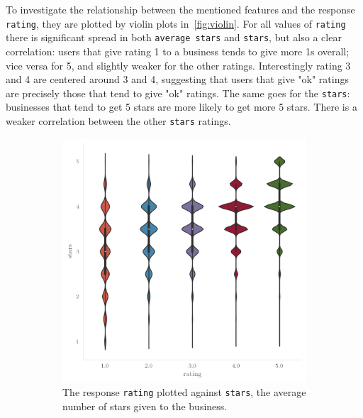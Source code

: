 To investigate the relationship between the mentioned features and the response
\texttt{rating}, they are plotted by violin plots in~\cref{fig:violin}. For all
values of \texttt{rating} there is significant spread in both \texttt{average stars} and \texttt{stars}, but also a clear correlation: users that give rating 1 to a business tends to give more 1s overall; vice versa for 5, and
slightly weaker for the other ratings. Interestingly rating 3 and 4 are centered around 3 and 4, suggesting
that users that give "ok" ratings are precisely those that tend to give "ok" ratings. The same goes for the \texttt{stars}: businesses that tend to get 5 stars are more likely to get more 5 stars. There is a weaker correlation between the other \texttt{stars} ratings. 

\begin{figure}[H]
    \begin{subfigure}
        \centering
        \includegraphics[width=\columnwidth]{Figures/rating_stars.png}
        \caption{The response \texttt{rating} plotted against
        \texttt{stars}, the average number of stars given to the business.}
    \end{subfigure}
    \begin{subfigure}
        \centering

\end{subfigure}
\end{figure}
